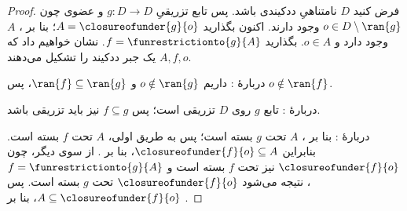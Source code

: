 \documentclass[../../../include/open-logic-section]{subfiles}
\begin{document}
\begin{proof}
فرض کنید $D$ نامتناهیِ ددکیندی باشد. پس تابع تزریقیِ $g \colon D \to
D$ و عضوی چون $o  \in D \setminus \ran{g}$ وجود دارند. اکنون بگذارید
$A = \closureofunder{g}{o}$؛ بنا بر ، $A$ وجود
دارد و $o \in A$. بگذارید $f = \funrestrictionto{g}{A}$. نشان خواهیم
داد که $A, f, o$ یک جبر ددکیند را تشکیل می‌دهند.

دربارهٔ : داریم $o \notin \ran{g}$ و $\ran{f}
\subseteq \ran{g}$، پس $o\notin \ran{f}$.

دربارهٔ : تابع $g$ روی $D$ تزریقی است؛ پس
$f \subseteq g$ نیز باید تزریقی باشد.

دربارهٔ : بنا بر ، $A$ تحت
$g$ بسته است؛ پس به طریق اولی، $A$ تحت $f$ بسته است. بنابراین
$\closureofunder{f}{o} \subseteq A$، بنا بر . از سوی
دیگر، چون $\closureofunder{f}{o}$ نیز تحت $f$ بسته است و $f =
\funrestrictionto{g}{A}$، نتیجه می‌شود $\closureofunder{f}{o}$ تحت $g$
بسته است. پس $A \subseteq \closureofunder{f}{o}$، بنا بر
.
\end{proof}
\end{document}
